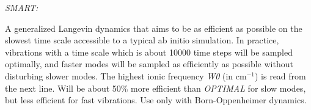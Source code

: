 \documentclass[twoside,10pt,titlepage,a4paper]{article}
\begin{document}
{    {\sl SMART:} \hfill\begin{minipage}[t]{10cm}
                  A generalized Langevin dynamics that aims to be as efficient as possible
                  on the slowest time scale accessible to a typical ab initio simulation. 
                  In practice, vibrations with a time scale which is about 10000 time steps
                  will be sampled optimally, and faster modes will be sampled as efficiently
                  as possible without disturbing slower modes. 
                  The highest ionic frequency {\sl W0} (in cm$^{-1}$) is read from the 
                  next line. Will be about 50\%{} more efficient than {\sl OPTIMAL} for slow
                  modes, but less efficient for fast vibrations. Use only with Born-Oppenheimer
                  dynamics.
                      \end{minipage}                      
  }
\end{document}
